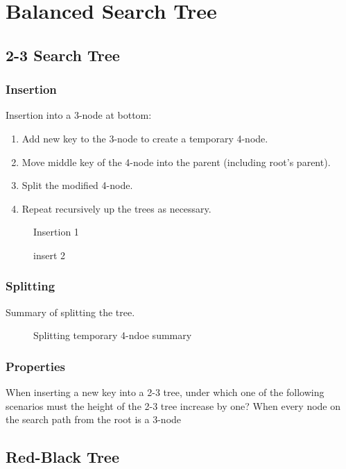 \chapter{Balanced Search Tree}
\section{2-3 Search Tree}
\subsection{Insertion}
Insertion into a 3-node at bottom:
\begin{enumerate}
\item Add new key to the 3-node to create a temporary 4-node.
\item Move middle key of the 4-node into the parent (including root's parent).
\item Split the modified 4-node.
\item Repeat recursively up the trees as necessary.
\end{enumerate}
\begin{figure}[hbtp]
\centering
{}
\caption{Insertion 1}
\label{fig:LABEL}
\end{figure}

\begin{figure}[hbtp]
\centering
{}
\caption{insert 2}
\label{fig:LABEL}
\end{figure}

\subsection{Splitting}
Summary of splitting the tree. 
\begin{figure}[hbtp]
\centering
{}
\caption{Splitting temporary 4-ndoe summary}
\label{fig:splitting}
\end{figure}

\subsection{Properties}
When inserting a new key into a 2-3 tree, under which one of the following scenarios must the height of the 2-3 tree increase by one? When every node on the search path from the root is a 3-node

\section{Red-Black Tree}\label{rbtree}
